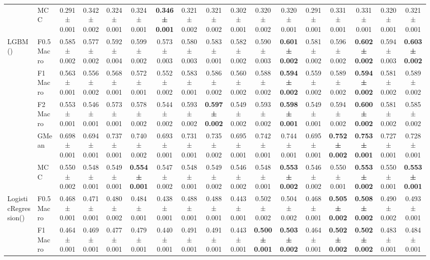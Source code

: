 \begin{table}[H]
{\begin{tabular}{llccccccccccccccc}
 & MCC & 0.291 ± 0.001 & 0.342 ± 0.002 & 0.324 ± 0.001 & 0.324 ± 0.001 & \textbf{0.346 ± 0.001} & 0.321 ± 0.002 & 0.321 ± 0.002 & 0.302 ± 0.001 & 0.320 ± 0.002 & 0.320 ± 0.001 & 0.291 ± 0.001 & 0.331 ± 0.001 & 0.331 ± 0.001 & 0.320 ± 0.001 & 0.321 ± 0.001 \\
\cline{1-17}
\multirow[t]{5}{*}{LGBM()} & F0.5 Macro & 0.585 ± 0.002 & 0.577 ± 0.002 & 0.592 ± 0.004 & 0.599 ± 0.002 & 0.573 ± 0.003 & 0.580 ± 0.003 & 0.583 ± 0.001 & 0.582 ± 0.002 & 0.590 ± 0.003 & \textbf{0.601 ± 0.002} & 0.581 ± 0.002 & 0.596 ± 0.002 & \textbf{0.602 ± 0.002} & 0.594 ± 0.003 & \textbf{0.603 ± 0.002} \\
 & F1 Macro & 0.563 ± 0.001 & 0.556 ± 0.002 & 0.568 ± 0.001 & 0.572 ± 0.001 & 0.552 ± 0.002 & 0.583 ± 0.001 & 0.586 ± 0.002 & 0.560 ± 0.002 & 0.588 ± 0.002 & \textbf{0.594 ± 0.002} & 0.559 ± 0.002 & 0.589 ± 0.002 & \textbf{0.594 ± 0.002} & 0.581 ± 0.002 & 0.589 ± 0.002 \\
 & F2 Macro & 0.553 ± 0.001 & 0.546 ± 0.001 & 0.573 ± 0.001 & 0.578 ± 0.002 & 0.544 ± 0.002 & 0.593 ± 0.002 & \textbf{0.597 ± 0.002} & 0.549 ± 0.002 & 0.593 ± 0.002 & \textbf{0.598 ± 0.001} & 0.549 ± 0.001 & 0.594 ± 0.002 & \textbf{0.600 ± 0.002} & 0.581 ± 0.002 & 0.585 ± 0.002 \\
 & GMean & 0.698 ± 0.001 & 0.694 ± 0.001 & 0.737 ± 0.001 & 0.740 ± 0.002 & 0.693 ± 0.001 & 0.731 ± 0.001 & 0.735 ± 0.002 & 0.695 ± 0.001 & 0.742 ± 0.001 & 0.744 ± 0.001 & 0.695 ± 0.001 & \textbf{0.752 ± 0.002} & \textbf{0.753 ± 0.001} & 0.727 ± 0.001 & 0.728 ± 0.001 \\
 & MCC & 0.550 ± 0.002 & 0.548 ± 0.001 & 0.549 ± 0.001 & \textbf{0.554 ± 0.001} & 0.547 ± 0.002 & 0.548 ± 0.001 & 0.549 ± 0.002 & 0.546 ± 0.002 & 0.548 ± 0.001 & \textbf{0.553 ± 0.002} & 0.546 ± 0.002 & 0.550 ± 0.001 & \textbf{0.553 ± 0.002} & 0.550 ± 0.001 & \textbf{0.553 ± 0.001} \\
\cline{1-17}
\multirow[t]{5}{*}{LogisticRegression()} & F0.5 Macro & 0.468 ± 0.001 & 0.471 ± 0.001 & 0.480 ± 0.002 & 0.484 ± 0.001 & 0.438 ± 0.001 & 0.488 ± 0.001 & 0.488 ± 0.001 & 0.443 ± 0.001 & 0.502 ± 0.002 & 0.504 ± 0.002 & 0.468 ± 0.001 & \textbf{0.505 ± 0.002} & \textbf{0.508 ± 0.002} & 0.490 ± 0.002 & 0.493 ± 0.001 \\
 & F1 Macro & 0.464 ± 0.001 & 0.469 ± 0.001 & 0.477 ± 0.001 & 0.479 ± 0.001 & 0.440 ± 0.001 & 0.491 ± 0.001 & 0.491 ± 0.001 & 0.443 ± 0.001 & \textbf{0.500 ± 0.001} & \textbf{0.503 ± 0.002} & 0.464 ± 0.001 & \textbf{0.502 ± 0.002} & \textbf{0.502 ± 0.002} & 0.483 ± 0.001 & 0.484 ± 0.001 \\

\end{tabular}}
\end{table}
